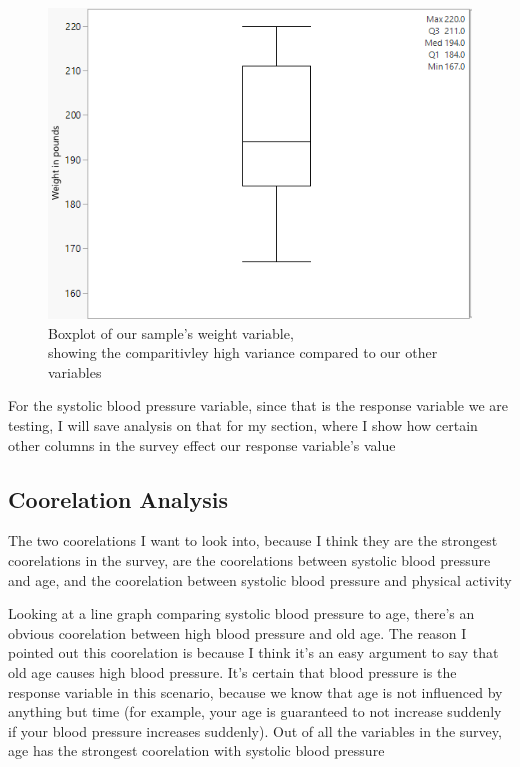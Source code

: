 \documentclass[14pt]{article}
\begin{document}
\begin{enumerate}
\begin{enumerate}[(a)]
\begin{figure}[h]
\captionsetup{justification=centering}
\includegraphics[scale=0.75]{hw1Pics/weightboxplot.PNG}
\centering
\caption{Boxplot of our sample's weight variable, \\ showing the comparitivley high variance compared to our other variables}
\end{figure}

For the systolic blood pressure variable, since that is the response variable we are testing, I will save analysis on that for my section, where I show how certain other columns in the survey effect our response variable's value \\

\subsection*{Coorelation Analysis}

The two coorelations I want to look into, because I think they are the strongest coorelations in the survey, are the coorelations between systolic blood pressure and age, and the coorelation between systolic blood pressure and physical activity \pagebreak

Looking at a line graph comparing systolic blood pressure to age, there's an obvious coorelation between high blood pressure and old age. The reason I pointed out this coorelation is because I think it's an easy argument to say that old age causes high blood pressure. It's certain that blood pressure is the response variable in this scenario, because we know that age is not influenced by anything but time (for example, your age is guaranteed to not increase suddenly if your blood pressure increases suddenly). Out of all the variables in the survey, age has the strongest coorelation with systolic blood pressure \\


\end{enumerate}
\end{enumerate}
\end{document}
